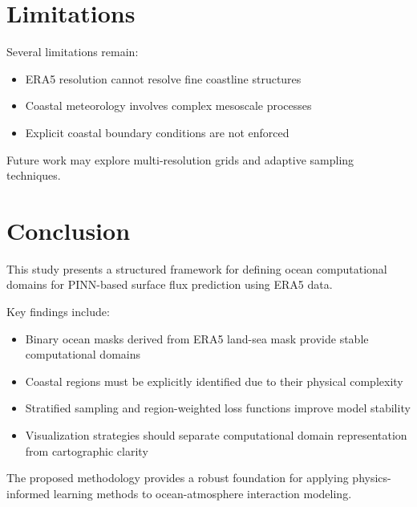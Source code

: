 \documentclass[12pt,a4paper]{article}
\begin{document}
\section{Limitations}

Several limitations remain:

\begin{itemize}
\item ERA5 resolution cannot resolve fine coastline structures
\item Coastal meteorology involves complex mesoscale processes
\item Explicit coastal boundary conditions are not enforced
\end{itemize}

Future work may explore multi-resolution grids and adaptive sampling techniques.

\section{Conclusion}

This study presents a structured framework for defining ocean computational domains for PINN-based surface flux prediction using ERA5 data.

Key findings include:

\begin{itemize}
\item Binary ocean masks derived from ERA5 land-sea mask provide stable computational domains
\item Coastal regions must be explicitly identified due to their physical complexity
\item Stratified sampling and region-weighted loss functions improve model stability
\item Visualization strategies should separate computational domain representation from cartographic clarity
\end{itemize}

The proposed methodology provides a robust foundation for applying physics-informed learning methods to ocean-atmosphere interaction modeling.
\end{document}
